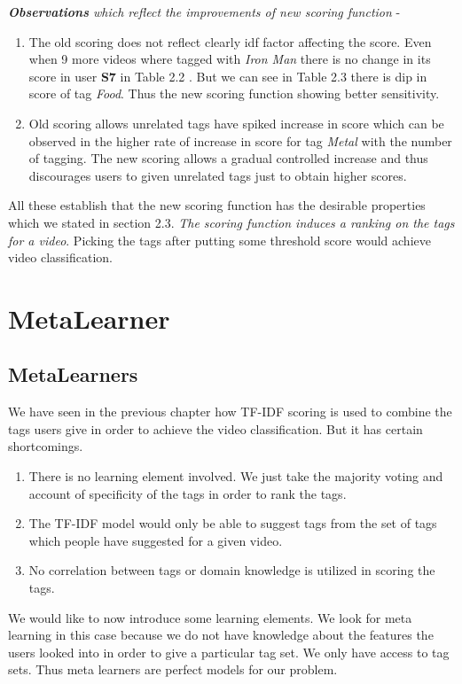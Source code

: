 \documentclass[12pt]{report}
\begin{document}
\emph{\textbf{Observations} which reflect the improvements of new scoring function} - 
\begin{enumerate}
  \item The old scoring does not reflect clearly idf factor affecting the score. Even when 9 more videos where tagged with \emph{Iron Man} there is no change in its score in user \textbf{S7} in Table 2.2 . But we can see in Table 2.3 there is dip in score of tag \emph{Food}. Thus the new scoring function showing better sensitivity.
  \item Old scoring allows unrelated tags have spiked increase in score which can be observed in the higher rate of increase in score for tag \emph{Metal} with the number of tagging. The new scoring allows a gradual controlled increase and thus discourages users to given unrelated tags just to obtain higher scores.
\end{enumerate}
All these establish that the new scoring function has the desirable properties which we stated in section 2.3. \emph{The scoring function induces a ranking on the tags for a video}. Picking the tags after putting some threshold score would achieve video classification.
 
\chapter{MetaLearner}
\section{MetaLearners}
We have seen in the previous chapter how TF-IDF scoring is used to combine the tags users give in order to achieve the video classification. But it has certain shortcomings. 
\begin{enumerate}
\item There is no learning element involved. We just take the majority voting and account of specificity of the tags in order to rank the tags.
\item The TF-IDF model would only be able to suggest tags from the set of tags which people have suggested for a given video. 
\item No correlation between tags or domain knowledge is utilized in scoring the tags.
\end{enumerate}

We would like to now introduce some learning elements. We look for meta learning in this case because we do not have knowledge about the features the users looked into in order to give a particular tag set. We only have access to tag sets. Thus meta learners are perfect models for our problem.
\vspace{1em}\\
\end{document}
